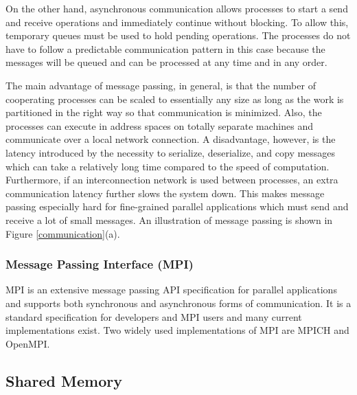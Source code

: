 \documentclass[11pt]{book}
\begin{document}
On the other hand, asynchronous communication allows processes to start a send and receive
operations and immediately continue without blocking.  To allow this, temporary queues must be used
to hold pending operations.  The processes do not have to follow a predictable communication pattern
in this case because the messages will be queued and can be processed at any time and in any order.

The main advantage of message passing, in general, is that the number of cooperating processes can
be scaled to essentially any size as long as the work is partitioned in the right way so that
communication is minimized.  Also, the processes can execute in address spaces on totally separate
machines and communicate over a local network connection.  A disadvantage, however, is the latency
introduced by the necessity to serialize, deserialize, and copy messages which can take a relatively
long time compared to the speed of computation.  Furthermore, if an interconnection network is used
between processes, an extra communication latency further slows the system down.  This makes message
passing especially hard for fine-grained parallel applications which must send and receive a lot of
small messages.  An illustration of message passing is shown in Figure \ref{communication}(a).

\subsubsection{Message Passing Interface (MPI)}

MPI \cite{gropp-94} is an extensive message passing API specification for parallel applications and
supports both synchronous and asynchronous forms of communication.  It is a standard specification
for developers and MPI users and many current implementations exist.  Two widely used
implementations of MPI are MPICH and OpenMPI.

\subsection{Shared Memory}
\end{document}
